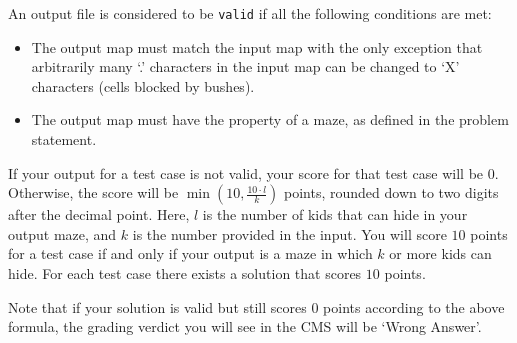 An output file is considered to be \texttt{valid} if all the following conditions are met:
\begin{itemize}
\item The output map must match the input map with the only exception that arbitrarily many `.' characters in the input map can be changed to `X' characters (cells blocked by bushes).
\item The output map must have the property of a maze, as defined in the problem statement.
\end{itemize}

If your output for a test case is not valid, your score for that test case will be $0$. Otherwise, the score will be $\min(10, \frac{10 \cdot l}{k})$ points, rounded down to two digits after the decimal point. Here, $l$ is the number of kids that can hide in your output maze, and $k$ is the number provided in the input. You will score $10$ points for a test case if and only if your output is a maze in which $k$ or more kids can hide. For each test case there exists a solution that scores $10$ points.

Note that if your solution is valid but still scores $0$ points according to the above formula, the grading verdict you will see in the CMS will be `Wrong Answer'.